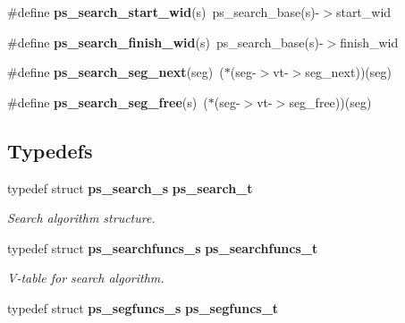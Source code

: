 \begin{DoxyCompactItemize}
\item 
\#define {\bfseries ps\+\_\+search\+\_\+start\+\_\+wid}(s)~ps\+\_\+search\+\_\+base(s)-\/$>$start\+\_\+wid\label{pocketsphinx__internal_8h_a6dc7da2c1bc3bfb15d5fbe3618a4e3d4}

\item 
\#define {\bfseries ps\+\_\+search\+\_\+finish\+\_\+wid}(s)~ps\+\_\+search\+\_\+base(s)-\/$>$finish\+\_\+wid\label{pocketsphinx__internal_8h_aaeee657147579bc652c494989622f6b4}

\item 
\#define {\bfseries ps\+\_\+search\+\_\+seg\+\_\+next}(seg)~($\ast$(seg-\/$>$vt-\/$>$seg\+\_\+next))(seg)\label{pocketsphinx__internal_8h_ae7c150fad9fc9e8a13e632a1386b8f56}

\item 
\#define {\bfseries ps\+\_\+search\+\_\+seg\+\_\+free}(s)~($\ast$(seg-\/$>$vt-\/$>$seg\+\_\+free))(seg)\label{pocketsphinx__internal_8h_a38f6b225e3eace3793cdae8135b0aaab}

\end{DoxyCompactItemize}
\subsection*{Typedefs}
\begin{DoxyCompactItemize}
\item 
typedef struct {\bf ps\+\_\+search\+\_\+s} {\bf ps\+\_\+search\+\_\+t}\label{pocketsphinx__internal_8h_adc3de4d62e46c5e6cb93d09fb61be8ee}

\begin{DoxyCompactList}\small\item\em Search algorithm structure. \end{DoxyCompactList}\item 
typedef struct {\bf ps\+\_\+searchfuncs\+\_\+s} {\bf ps\+\_\+searchfuncs\+\_\+t}\label{pocketsphinx__internal_8h_a0eae078e32bd5f339792884c68aad8b3}

\begin{DoxyCompactList}\small\item\em V-\/table for search algorithm. \end{DoxyCompactList}\item 
typedef struct {\bf ps\+\_\+segfuncs\+\_\+s} {\bfseries ps\+\_\+segfuncs\+\_\+t}\label{pocketsphinx__internal_8h_a08187b85c6bc5b4991632dc78e237977}

\end{DoxyCompactItemize}
